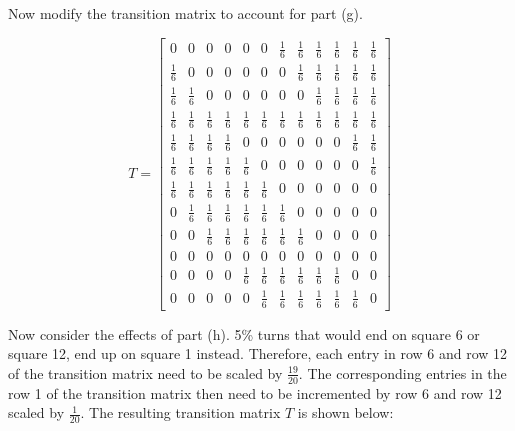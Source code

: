 \documentclass[fleqn]{article}
\begin{document}
\begin{enumerate}[nolistsep]
\begin{enumerate}
			Now modify the transition matrix to account for part (g).
			
			\begin{equation*}
				T = \begin{bmatrix}
					0 & 0 & 0 & 0 & 0 & 0 & \frac{1}{6} & \frac{1}{6} & \frac{1}{6} & \frac{1}{6} & \frac{1}{6} & \frac{1}{6}\\[3pt]
					\frac{1}{6} & 0 & 0 & 0 & 0 & 0 & 0 & \frac{1}{6} & \frac{1}{6} & \frac{1}{6} & \frac{1}{6} & \frac{1}{6}\\[3pt]
					\frac{1}{6} & \frac{1}{6} & 0 & 0 & 0 & 0 & 0 & 0 & \frac{1}{6} & \frac{1}{6} & \frac{1}{6} & \frac{1}{6}\\[3pt]
					\frac{1}{6} & \frac{1}{6} & \frac{1}{6} & \frac{1}{6} & \frac{1}{6} & \frac{1}{6} & \frac{1}{6} & \frac{1}{6} & \frac{1}{6} & \frac{1}{6} & \frac{1}{6} & \frac{1}{6}\\[3pt]
					\frac{1}{6} & \frac{1}{6} & \frac{1}{6} & \frac{1}{6} & 0 & 0 & 0 & 0 & 0 & 0 & \frac{1}{6} & \frac{1}{6}\\[3pt]
					\frac{1}{6} & \frac{1}{6} & \frac{1}{6} & \frac{1}{6} & \frac{1}{6} & 0 & 0 & 0 & 0 & 0 & 0 & \frac{1}{6}\\[3pt]
					\frac{1}{6} & \frac{1}{6} & \frac{1}{6} & \frac{1}{6} & \frac{1}{6} & \frac{1}{6} & 0 & 0 & 0 & 0 & 0 & 0\\[3pt]
					0 & \frac{1}{6} & \frac{1}{6} & \frac{1}{6} & \frac{1}{6} & \frac{1}{6} & \frac{1}{6} & 0 & 0 & 0 & 0 & 0\\[3pt]
					0 & 0 & \frac{1}{6} & \frac{1}{6} & \frac{1}{6} & \frac{1}{6} & \frac{1}{6} & \frac{1}{6} & 0 & 0 & 0 & 0\\[3pt]
					0 & 0 & 0 & 0 & 0 & 0 & 0 & 0 & 0 & 0 & 0 & 0\\[3pt]
					0 & 0 & 0 & 0 & \frac{1}{6} & \frac{1}{6} & \frac{1}{6} & \frac{1}{6} & \frac{1}{6} & \frac{1}{6} & 0 & 0\\[3pt]
					0 & 0 & 0 & 0 & 0 & \frac{1}{6} & \frac{1}{6} & \frac{1}{6} & \frac{1}{6} & \frac{1}{6} & \frac{1}{6} & 0
				\end{bmatrix}
			\end{equation*}
			
			Now consider the effects of part (h). 5\% turns that would end on square 6 or square 12, end up on square 1 instead. Therefore, each entry in row 6 and row 12 of the transition matrix need to be scaled by $\frac{19}{20}$. The corresponding entries in the row 1 of the transition matrix then need to be incremented by row 6 and row 12 scaled by $\frac{1}{20}$. The resulting transition matrix $T$ is shown below:
			

\end{enumerate}
\end{enumerate}
\end{document}
